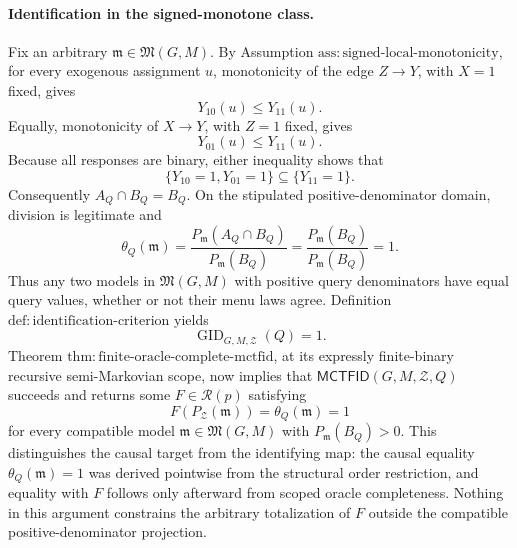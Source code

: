 \paragraph{Identification in the signed-monotone class.}
Fix an arbitrary \(\mathfrak m\in\mathfrak M(G,M)\).  By Assumption \(\mathrm{ass:signed\text{-}local\text{-}monotonicity}\), for every exogenous assignment \(u\), monotonicity of the edge \(Z\to Y\), with \(X=1\) fixed, gives
\[
 Y_{10}(u)\le Y_{11}(u).
\]
Equally, monotonicity of \(X\to Y\), with \(Z=1\) fixed, gives
\[
 Y_{01}(u)\le Y_{11}(u).
\]
Because all responses are binary, either inequality shows that
\[
 \{Y_{10}=1,Y_{01}=1\}\subseteq\{Y_{11}=1\}.
\]
Consequently \(A_Q\cap B_Q=B_Q\).  On the stipulated positive-denominator domain, division is legitimate and
\[
 \theta_Q(\mathfrak m)
 =\frac{P_{\mathfrak m}(A_Q\cap B_Q)}{P_{\mathfrak m}(B_Q)}
 =\frac{P_{\mathfrak m}(B_Q)}{P_{\mathfrak m}(B_Q)}
 =1.
\]
Thus any two models in \(\mathfrak M(G,M)\) with positive query denominators have equal query values, whether or not their menu laws agree.  Definition \(\mathrm{def:identification\text{-}criterion}\) yields
\[
 \operatorname{GID}_{G,M,\mathcal Z}(Q)=1.
\]
Theorem \(\mathrm{thm:finite\text{-}oracle\text{-}complete\text{-}mctfid}\), at its expressly finite-binary recursive semi-Markovian scope, now implies that \(\mathsf{MCTFID}(G,M,\mathcal Z,Q)\) succeeds and returns some \(F\in\mathcal R(p)\) satisfying
\[
 F(P_{\mathcal Z}(\mathfrak m))=\theta_Q(\mathfrak m)=1
\]
for every compatible model \(\mathfrak m\in\mathfrak M(G,M)\) with \(P_{\mathfrak m}(B_Q)>0\).  This distinguishes the causal target from the identifying map: the causal equality \(\theta_Q(\mathfrak m)=1\) was derived pointwise from the structural order restriction, and equality with \(F\) follows only afterward from scoped oracle completeness.  Nothing in this argument constrains the arbitrary totalization of \(F\) outside the compatible positive-denominator projection.

